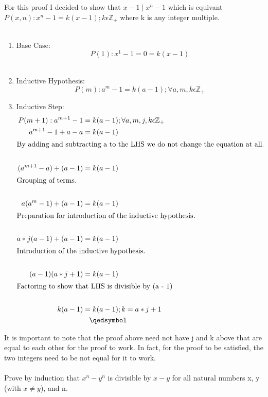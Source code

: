 \documentclass[12pt]{article}
\begin{document}
\noindent For this proof I decided to show that \begin{math}x - 1\mid x^n - 1\end{math} which is equivant \begin{math}P(x,n):x^n - 1 = k(x - 1) ; k \epsilon \mathbb{Z}_+ \end{math} where k is any integer multiple.\\\\ 
\begin{enumerate}
\item Base Case:\\
\[P(1):x^1 - 1 = 0 = k(x - 1)\]\\
\item Inductive Hypothesis:
\[P(m):a^m - 1 = k(a - 1) ; \forall a,m,k \epsilon \mathbb{Z}_+\]
\item Inductive Step:\\
\begin{align*}
P(m+1):a^{m+1} - 1 &= k(a - 1) ; \forall a,m,j,k \epsilon \mathbb{Z}_+\\
a^{m+1} - 1 + a - a &= k(a - 1)\\
\intertext{By adding and subtracting a to the LHS we do not change the equation at all.}\\
(a^{m+1} - a) + (a - 1) &= k(a - 1)\\
\intertext{Grouping of terms.}\\
a(a^{m} - 1) + (a - 1) &= k(a - 1)\\
\intertext{Preparation for introduction of the inductive hypothesis.}\\
a*j(a - 1) + (a - 1) &= k(a - 1)\\
\intertext{Introduction of the inductive hypothesis.}\\
(a - 1)(a*j + 1) &= k(a - 1)\\
\intertext{Factoring to show that LHS is divisible by (a - 1)}\\
k(a - 1) &= k(a - 1); k = a*j + 1\\
&\hspace{0.3cm}\qedsymbol
\end{align*}
\end{enumerate}
It is important to note that the proof above need not have j and k above that are equal to each other for the proof to work. In fact, for the proof to be satisfied, the two integers need to be not equal for it to work.\\\\
Prove by induction that \begin{math}x^n - y^n\end{math} is divisible by \begin{math}x - y\end{math} for all natural numbers x, y (with \begin{math}x \not = y\end{math}), and n.\\\\
\end{document}
